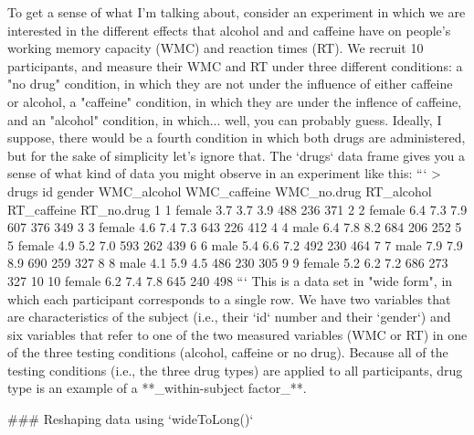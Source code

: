 To get a sense of what I'm talking about, consider an experiment in which we are interested in the different effects that alcohol and and caffeine have on people's working memory capacity (WMC) and reaction times (RT). We recruit 10 participants, and measure their WMC and RT under three different conditions: a "no drug" condition, in which they are not under the influence of either caffeine or alcohol, a "caffeine" condition, in which they are under the inflence of caffeine, and an "alcohol" condition, in which... well, you can probably guess. Ideally, I suppose, there would be a fourth condition in which both drugs are administered, but for the sake of simplicity let's ignore that. The `drugs` data frame gives you a sense of what kind of data you might observe in an experiment like this:
```
> drugs
   id gender WMC_alcohol WMC_caffeine WMC_no.drug RT_alcohol RT_caffeine RT_no.drug
1   1 female         3.7          3.7         3.9        488         236        371
2   2 female         6.4          7.3         7.9        607         376        349
3   3 female         4.6          7.4         7.3        643         226        412
4   4   male         6.4          7.8         8.2        684         206        252
5   5 female         4.9          5.2         7.0        593         262        439
6   6   male         5.4          6.6         7.2        492         230        464
7   7   male         7.9          7.9         8.9        690         259        327
8   8   male         4.1          5.9         4.5        486         230        305
9   9 female         5.2          6.2         7.2        686         273        327
10 10 female         6.2          7.4         7.8        645         240        498
```
This is a data set in "wide form", in which each participant corresponds to a single row. We have two variables that are characteristics of the subject (i.e., their `id` number and their `gender`) and six variables that refer to one of the two measured variables (WMC or RT) in one of the three testing conditions (alcohol, caffeine or no drug). Because all of the testing conditions (i.e., the three drug types) are applied to all participants, drug type is an example of a **_within-subject factor_**. 


### Reshaping data using `wideToLong()`

